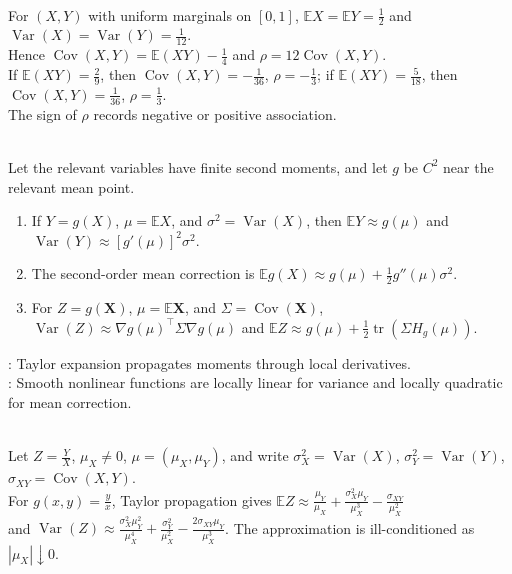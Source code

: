 \begin{example} \label{ex:covariance-correlation-bivariate-uniform-family} \\
For $(X,Y)$ with uniform marginals on $[0,1]$, $\mathbb{E}X=\mathbb{E}Y=\frac{1}{2}$ and $\operatorname{Var}(X)=\operatorname{Var}(Y)=\frac{1}{12}$.\\
Hence $\operatorname{Cov}(X,Y)=\mathbb{E}(XY)-\frac{1}{4}$ and $\rho=12\operatorname{Cov}(X,Y)$.\\
If $\mathbb{E}(XY)=\frac{2}{9}$, then $\operatorname{Cov}(X,Y)=-\frac{1}{36}$, $\rho=-\frac{1}{3}$; if $\mathbb{E}(XY)=\frac{5}{18}$, then $\operatorname{Cov}(X,Y)=\frac{1}{36}$, $\rho=\frac{1}{3}$.\\
The sign of $\rho$ records negative or positive association.
\end{example}

\begin{method} \label{meth:moment-propagation-error-propagation} \\
Let the relevant variables have finite second moments, and let $g$ be $C^2$ near the relevant mean point.
\begin{enumerate}[label=(\roman*)]
\setlength{\itemsep}{0pt}
\item If $Y=g(X)$, $\mu=\mathbb{E}X$, and $\sigma^2=\operatorname{Var}(X)$, then $\mathbb{E}Y\approx g(\mu)$ and $\operatorname{Var}(Y)\approx[g'(\mu)]^2\sigma^2$.
\item The second-order mean correction is $\mathbb{E}g(X)\approx g(\mu)+\frac12g''(\mu)\sigma^2$.
\item For $Z=g(\mathbf{X})$, $\mu=\mathbb{E}\mathbf{X}$, and $\Sigma=\operatorname{Cov}(\mathbf{X})$, $\operatorname{Var}(Z)\approx\nabla g(\mu)^\top\Sigma\nabla g(\mu)$ and $\mathbb{E}Z\approx g(\mu)+\frac12\operatorname{tr}(\Sigma H_g(\mu))$.
\end{enumerate}
: Taylor expansion propagates moments through local derivatives.\\
: Smooth nonlinear functions are locally linear for variance and locally quadratic for mean correction.
\end{method}

\begin{example} \label{ex:ratio-moment-propagation} \\
Let $Z=\frac{Y}{X}$, $\mu_X\neq0$, $\mu=(\mu_X,\mu_Y)$, and write $\sigma_X^2=\operatorname{Var}(X)$, $\sigma_Y^2=\operatorname{Var}(Y)$, $\sigma_{XY}=\operatorname{Cov}(X,Y)$.\\
For $g(x,y)=\frac{y}{x}$, Taylor propagation gives $\mathbb{E}Z\approx\frac{\mu_Y}{\mu_X}+\frac{\sigma_X^2\mu_Y}{\mu_X^3}-\frac{\sigma_{XY}}{\mu_X^2}$\\
and $\operatorname{Var}(Z)\approx\frac{\sigma_X^2\mu_Y^2}{\mu_X^4}+\frac{\sigma_Y^2}{\mu_X^2}-\frac{2\sigma_{XY}\mu_Y}{\mu_X^3}$. The approximation is ill-conditioned as $|\mu_X|\downarrow0$.
\end{example}
